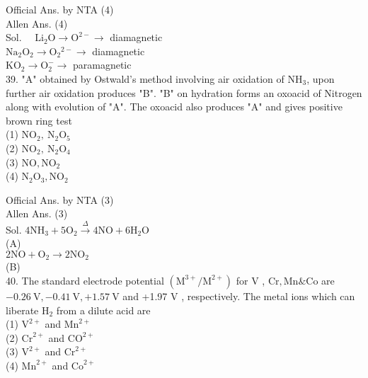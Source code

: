 \documentclass[10pt]{article}
\begin{document}
Official Ans. by NTA (4)\\
Allen Ans. (4)\\
Sol. \(\quad \mathrm{Li}_{2} \mathrm{O} \rightarrow \mathrm{O}^{2-} \rightarrow\) diamagnetic\\
\(\mathrm{Na}_{2} \mathrm{O}_{2} \rightarrow \mathrm{O}_{2}{ }^{2-} \rightarrow\) diamagnetic\\
\(\mathrm{KO}_{2} \rightarrow \mathrm{O}_{2}^{-} \rightarrow\) paramagnetic\\
39. "A" obtained by Ostwald's method involving air oxidation of \(\mathrm{NH}_{3}\), upon further air oxidation produces "B". "B" on hydration forms an oxoacid of Nitrogen along with evolution of "A". The oxoacid also produces "A" and gives positive brown ring test\\
(1) \(\mathrm{NO}_{2}, \mathrm{~N}_{2} \mathrm{O}_{5}\)\\
(2) \(\mathrm{NO}_{2}, \mathrm{~N}_{2} \mathrm{O}_{4}\)\\
(3) \(\mathrm{NO}, \mathrm{NO}_{2}\)\\
(4) \(\mathrm{N}_{2} \mathrm{O}_{3}, \mathrm{NO}_{2}\)

Official Ans. by NTA (3)\\
Allen Ans. (3)\\
Sol. \(4 \mathrm{NH}_{3}+5 \mathrm{O}_{2} \xrightarrow{\Delta} 4 \mathrm{NO}+6 \mathrm{H}_{2} \mathrm{O}\)\\
(A)\\
\(2 \mathrm{NO}+\mathrm{O}_{2} \longrightarrow 2 \mathrm{NO}_{2}\)\\
(B)\\
40. The standard electrode potential \(\left(\mathrm{M}^{3+} / \mathrm{M}^{2+}\right)\) for V , \(\mathrm{Cr}, \mathrm{Mn} \& \mathrm{Co}\) are \(-0.26 \mathrm{~V},-0.41 \mathrm{~V},+1.57 \mathrm{~V}\) and +1.97 V , respectively. The metal ions which can liberate \(\mathrm{H}_{2}\) from a dilute acid are\\
(1) \(\mathrm{V}^{2+}\) and \(\mathrm{Mn}^{2+}\)\\
(2) \(\mathrm{Cr}^{2+}\) and \(\mathrm{CO}^{2+}\)\\
(3) \(\mathrm{V}^{2+}\) and \(\mathrm{Cr}^{2+}\)\\
(4) \(\mathrm{Mn}^{2+}\) and \(\mathrm{Co}^{2+}\)
\end{document}
